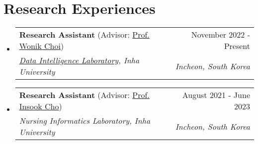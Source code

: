 \documentclass[letterpaper,11pt]{article}
\makeatletter
\newcommand{\resumeSubheading}[4]{
  \vspace{-1pt}\item
    \begin{tabular*}{0.97\textwidth}{l@{\extracolsep{\fill}}r}
      #1 & #2 \\
      \textit{\small#3} & \textit{\small #4} \\
    \end{tabular*}\vspace{-5pt}
}
\makeatother
\begin{document}
    \section{Research Experiences}
    \begin{itemize}[leftmargin=*,label=]
        \resumeSubheading
        {\textbf{Research Assistant} (Advisor: \href{http://bit.ly/3zSrQ8F}{Prof. Wonik Choi})}{November 2022 - Present}
            {\href{http://dilab.inha.ac.kr/}{Data Intelligence Laboratory}, Inha University}{Incheon, South Korea}
        \resumeSubheading
        {\textbf{Research Assistant} (Advisor: \href{http://bit.ly/412nYOw}{Prof. Insook Cho})}{August 2021 - June 2023}
            {Nursing Informatics Laboratory, Inha University}{Incheon, South Korea}
    \end{itemize}
    
\end{document}
